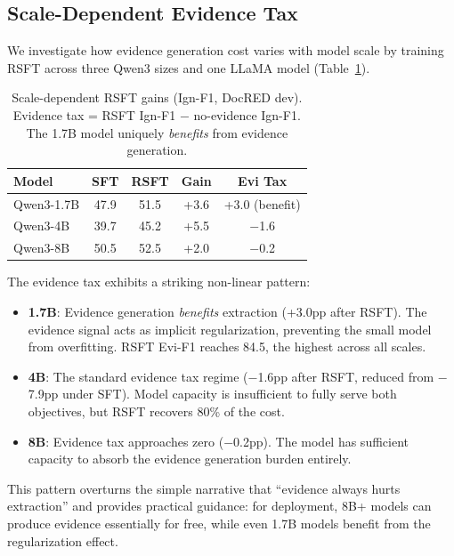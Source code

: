 \documentclass[11pt,a4paper]{article}
\begin{document}
\subsection{Scale-Dependent Evidence Tax}
\label{sec:scaling}

We investigate how evidence generation cost varies with model scale by training RSFT across three Qwen3 sizes and one LLaMA model (Table~\ref{tab:scaling}).

\begin{table}[t]
\centering
\small
\begin{tabular}{lcccc}
\toprule
\textbf{Model} & \textbf{SFT} & \textbf{RSFT} & \textbf{Gain} & \textbf{Evi Tax} \\
\midrule
Qwen3-1.7B & 47.9 & 51.5 & +3.6 & +3.0 (benefit) \\
Qwen3-4B & 39.7 & 45.2 & +5.5 & $-$1.6 \\
Qwen3-8B & 50.5 & 52.5 & +2.0 & $-$0.2 \\
\bottomrule
\end{tabular}
\caption{Scale-dependent RSFT gains (Ign-F1, DocRED dev). Evidence tax = RSFT Ign-F1 $-$ no-evidence Ign-F1. The 1.7B model uniquely \emph{benefits} from evidence generation.}
\label{tab:scaling}
\end{table}

The evidence tax exhibits a striking non-linear pattern:
\begin{itemize}
\item \textbf{1.7B}: Evidence generation \emph{benefits} extraction (+3.0pp after RSFT). The evidence signal acts as implicit regularization, preventing the small model from overfitting. RSFT Evi-F1 reaches 84.5, the highest across all scales.
\item \textbf{4B}: The standard evidence tax regime ($-$1.6pp after RSFT, reduced from $-$7.9pp under SFT). Model capacity is insufficient to fully serve both objectives, but RSFT recovers 80\% of the cost.
\item \textbf{8B}: Evidence tax approaches zero ($-$0.2pp). The model has sufficient capacity to absorb the evidence generation burden entirely.
\end{itemize}

This pattern overturns the simple narrative that ``evidence always hurts extraction'' and provides practical guidance: for deployment, 8B+ models can produce evidence essentially for free, while even 1.7B models benefit from the regularization effect.
\end{document}

